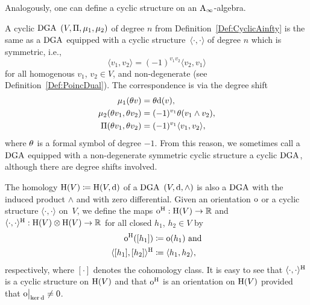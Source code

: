 \documentclass[\MainFolder/Text.tex]{subfiles}
\begin{document}
Analogously, one can define a cyclic structure on an $\mathrm{A}_\infty$-algebra.

\begin{Remark}\label{Rem:Eq}
A cyclic $\mathrm{DGA}$ $(V,\Pi,\mu_1,\mu_2)$ of degree $n$ from Definition~\ref{Def:CyclicAinfty} is the same as a $\mathrm{DGA}$ equipped with a cyclic structure~$\langle\cdot,\cdot\rangle$ of degree $n$ which is symmetric, i.e., 
\[ \langle v_1, v_2 \rangle = (-1)^{v_1 v_2} \langle v_2, v_1\rangle \]
for all homogenous $v_1$, $v_2\in V$, and non-degenerate (see Definition~\ref{Def:PoincDual}). The correspondence is via the degree shift
\begin{align*}
\mu_1(\theta v) &= \theta \mathrm{d}(v),\\
\mu_2(\theta v_1, \theta v_2) &= (-1)^{v_1}\theta(v_1\wedge v_2),\\
\Pi(\theta v_1, \theta v_2) & = (-1)^{v_1} \langle v_1,v_2\rangle,
\end{align*}
where $\theta$ is a formal symbol of degree $-1$. From this reason, we sometimes call a $\mathrm{DGA}$ equipped with a non-degenerate symmetric cyclic structure a cyclic $\mathrm{DGA}$, although there are degree shifts involved.
\end{Remark}

The homology $\mathrm{H}(V)\coloneqq \mathrm{H}(V,\mathrm{d})$ of a $\mathrm{DGA}$ $(V,\mathrm{d},\wedge)$ is also a $\mathrm{DGA}$ with the induced product $\wedge$ and with zero differential. Given an orientation $\mathrm{o}$ or a cyclic structure $\langle\cdot,\cdot\rangle$ on~$V$, we define the maps $\mathrm{o}^{\mathrm{H}}: \mathrm{H}(V) \rightarrow \mathbb{R}$ and $\langle\cdot,\cdot\rangle^{\mathrm{H}}: \mathrm{H}(V)\otimes\mathrm{H}(V)\rightarrow\mathbb{R}$ for all closed $h_1$, $h_2\in V$ by
\begin{equation}\label{Eq:IndOnHom}
\begin{aligned}
\mathrm{o}^{\mathrm{H}}([h_1]) &\coloneqq \mathrm{o}(h_1)\text{ and}\\
\langle[h_1],[h_2]\rangle^{\mathrm{H}} &\coloneqq \langle h_1, h_2\rangle,
\end{aligned}
\end{equation}
respectively, where $[\cdot]$ denotes the cohomology class. It is easy to see that $\langle\cdot,\cdot\rangle^{\mathrm{H}}$ is a cyclic structure on $\mathrm{H}(V)$ and that $\mathrm{o}^{\mathrm{H}}$ is an orientation on $\mathrm{H}(V)$ provided that $\Restr{\Or}{\Ker \Dd} \neq 0$. 
\end{document}
